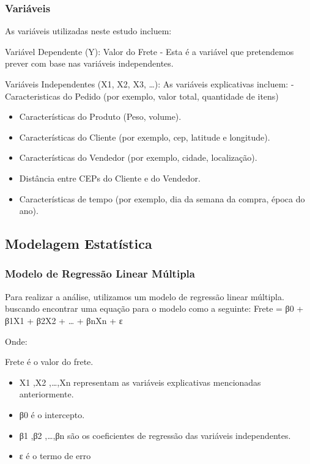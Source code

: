 \documentclass[
]{article}
\providecommand{\tightlist}{%
  \setlength{\itemsep}{0pt}\setlength{\parskip}{0pt}}
\begin{document}
\hypertarget{variuxe1veis}{%
\subsubsection{Variáveis}\label{variuxe1veis}}

As variáveis utilizadas neste estudo incluem:

Variável Dependente (Y): Valor do Frete - Esta é a variável que
pretendemos prever com base nas variáveis independentes.

Variáveis Independentes (X1, X2, X3, \ldots): As variáveis explicativas
incluem: - Caracteristicas do Pedido (por exemplo, valor total,
quantidade de itens)

\begin{itemize}
\item
  Características do Produto (Peso, volume).
\item
  Características do Cliente (por exemplo, cep, latitude e longitude).
\item
  Características do Vendedor (por exemplo, cidade, localização).
\item
  Distância entre CEPs do Cliente e do Vendedor.
\item
  Características de tempo (por exemplo, dia da semana da compra, época
  do ano).
\end{itemize}

\hypertarget{modelagem-estatuxedstica}{%
\subsection{Modelagem Estatística}\label{modelagem-estatuxedstica}}

\hypertarget{modelo-de-regressuxe3o-linear-muxfaltipla}{%
\subsubsection{Modelo de Regressão Linear
Múltipla}\label{modelo-de-regressuxe3o-linear-muxfaltipla}}

Para realizar a análise, utilizamos um modelo de regressão linear
múltipla. buscando encontrar uma equação para o modelo como a seguinte:
Frete = β0 + β1X1 + β2X2 + \ldots{} + βnXn + ε

Onde:

Frete é o valor do frete.

\begin{itemize}
\tightlist
\item
  X1 ,X2 ,\ldots,Xn representam as variáveis explicativas mencionadas
  anteriormente.
\item
  β0 é o intercepto.
\item
  β1 ,β2 ,\ldots,βn são os coeficientes de regressão das variáveis
  independentes.
\item
  ε é o termo de erro
\end{itemize}
\end{document}
